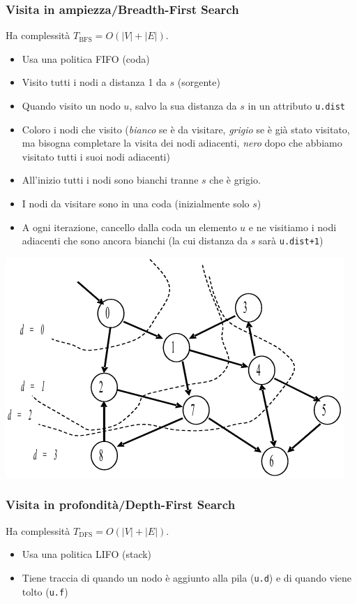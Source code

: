 \documentclass[10pt,a4paper]{article}
\newcommand{\code}{\texttt}
\begin{document}
\begin{multicols*}{2}
\subsubsection*{Visita in ampiezza/Breadth-First Search}
Ha complessità $T_\text{BFS} = O(|V| + |E|)$.
\begin{itemize}
    \item Usa una politica FIFO (coda)
    \item Visito tutti i nodi a distanza 1 da $s$ (sorgente)
    \item Quando visito un nodo $u$, salvo la sua distanza da $s$ in un attributo \code{u.dist}
    \item Coloro i nodi che visito (\emph{bianco} se è da visitare, \emph{grigio} se è già stato visitato, ma bisogna completare la visita dei nodi adiacenti, \emph{nero} dopo che abbiamo visitato tutti i suoi nodi adiacenti)
    \item All'inizio tutti i nodi sono bianchi tranne $s$ che è grigio.
    \item I nodi da visitare sono in una coda (inizialmente solo $s$)
    \item A ogni iterazione, cancello dalla coda un elemento $u$ e ne visitiamo i nodi adiacenti che sono ancora bianchi (la cui distanza da $s$ sarà \code{u.dist+1})
\end{itemize}

\centering
\includegraphics[width=0.7\linewidth]{graph_bfs.png}
\justifying

\subsubsection*{Visita in profondità/Depth-First Search}
Ha complessità $T_\text{DFS} = O(|V| + |E|)$.
\begin{itemize}
    \item Usa una politica LIFO (stack)
    \item Tiene traccia di quando un nodo è aggiunto alla pila (\code{u.d}) e di quando viene tolto (\code{u.f})
\end{itemize}


\end{multicols*}
\end{document}
